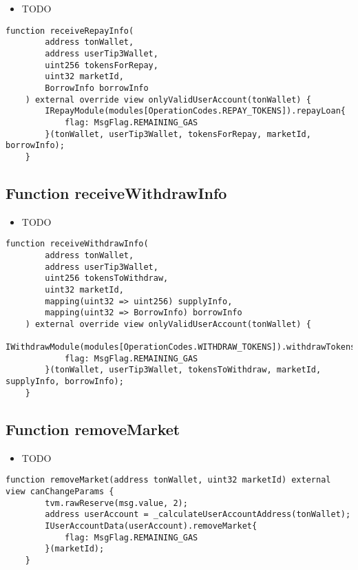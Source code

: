 \noindent\begin{itemize}
\item TODO
\end{itemize}

\begin{lstlisting}[firstnumber=288]
    function receiveRepayInfo(
        address tonWallet, 
        address userTip3Wallet, 
        uint256 tokensForRepay,
        uint32 marketId,
        BorrowInfo borrowInfo
    ) external override view onlyValidUserAccount(tonWallet) {
        IRepayModule(modules[OperationCodes.REPAY_TOKENS]).repayLoan{
            flag: MsgFlag.REMAINING_GAS
        }(tonWallet, userTip3Wallet, tokensForRepay, marketId, borrowInfo);
    }
\end{lstlisting}

\subsection{Function receiveWithdrawInfo}

\noindent\begin{itemize}
\item TODO
\end{itemize}

\begin{lstlisting}[firstnumber=194]
    function receiveWithdrawInfo(
        address tonWallet, 
        address userTip3Wallet,
        uint256 tokensToWithdraw,
        uint32 marketId,
        mapping(uint32 => uint256) supplyInfo,
        mapping(uint32 => BorrowInfo) borrowInfo
    ) external override view onlyValidUserAccount(tonWallet) {
        IWithdrawModule(modules[OperationCodes.WITHDRAW_TOKENS]).withdrawTokensFromMarket{
            flag: MsgFlag.REMAINING_GAS
        }(tonWallet, userTip3Wallet, tokensToWithdraw, marketId, supplyInfo, borrowInfo);
    }
\end{lstlisting}

\subsection{Function removeMarket}

\noindent\begin{itemize}
\item TODO
\end{itemize}

\begin{lstlisting}[firstnumber=533]
    function removeMarket(address tonWallet, uint32 marketId) external view canChangeParams {
        tvm.rawReserve(msg.value, 2);
        address userAccount = _calculateUserAccountAddress(tonWallet);
        IUserAccountData(userAccount).removeMarket{
            flag: MsgFlag.REMAINING_GAS
        }(marketId);
    }
\end{lstlisting}

